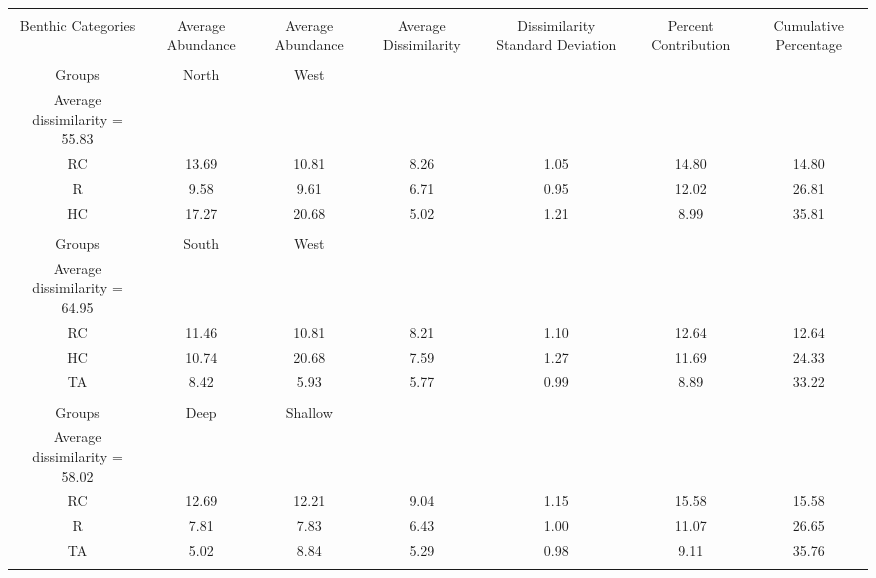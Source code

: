 \documentclass{article}
\begin{document}
\begin{table}[!htbp] \centering 
  \caption*{} 
  \label{} 
\begin{tabular}{@{\extracolsep{5pt}} ccccccc} 
\\[-1.8ex]\hline 
\hline \\[-1.8ex] 
Benthic Categories & Average Abundance	&  Average Abundance & Average Dissimilarity & Dissimilarity Standard Deviation & Percent Contribution & Cumulative Percentage\\
\hline \\[-1.8ex] 
Groups &North  &  West\\
Average dissimilarity = 55.83\\
RC	&      13.69	&     10.81&	   8.26	 &  1.05&	   14.80&	14.80\\
R	  &     9.58	&      9.61	&   6.71	  & 0.95	 &  12.02&	26.81\\
HC	  &    17.27	 &    20.68	&   5.02	&   1.21	&    8.99	&35.81\\
\hline\\[-1.8ex] 
Groups &South  &  West\\
Average dissimilarity = 64.95 \\
RC	&     11.46 &10.81 &8.21	  & 1.10	 &  12.64	&12.64\\
HC	&    10.74 &  20.68	& 7.59	 &  1.27	&   11.69	&24.33\\
TA	&      8.42 & 5.93 & 5.77	&   0.99	&    8.89	&33.22\\
\hline\\[-1.8ex] 
Groups& Deep  &  Shallow\\
Average dissimilarity = 58.02\\
RC	&     12.69	&        12.21	&   9.04	 &  1.15	   &15.58	&15.58\\
R	  &    7.81	   &      7.83	  & 6.43&	   1.00	&   11.07	&26.65\\
TA	    &  5.02	 &        8.84	  & 5.29	&   0.98	  &  9.11&	35.76\\

\hline \\[-1.8ex] 
\end{tabular} 
\end{table} 
\end{document}
